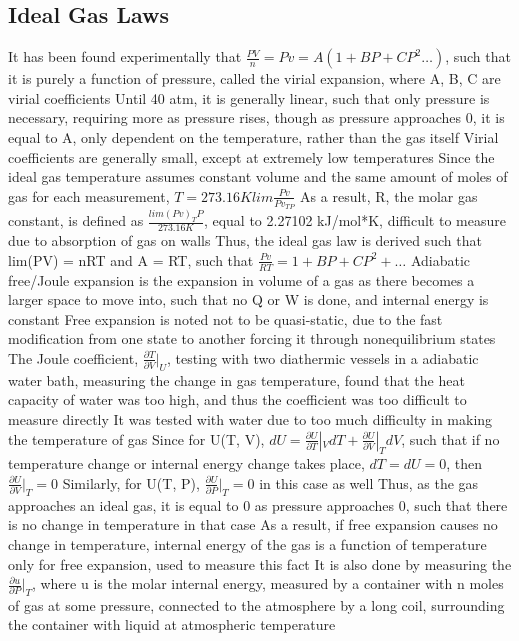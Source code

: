 \subsection{Ideal Gas Laws}
\begin{outline*}
\1 It has been found experimentally that $\frac{PV}{n} = Pv = A(1 + BP + CP^2 \dots)$, such that it is purely a function of pressure, called the virial expansion, where A, B, C are virial coefficients
\2 Until 40 atm, it is generally linear, such that only pressure is necessary, requiring more as pressure rises, though as pressure approaches 0, it is equal to A, only dependent on the temperature, rather than the gas itself 
\3 Virial coefficients are generally small, except at extremely low temperatures
\2 Since the ideal gas temperature assumes constant volume and the same amount of moles of gas for each measurement, $T = 273.16 K lim \frac{Pv}{Pv_{TP}}$
\3 As a result, R, the molar gas constant, is defined as $\frac{lim(Pv)_TP}{273.16 K}$, equal to 2.27102 kJ/mol*K, difficult to measure due to absorption of gas on walls
\3 Thus, the ideal gas law is derived such that lim(PV) = nRT and A = RT, such that $\frac{Pv}{RT} = 1 + BP + CP^2 + \dots$
\1 Adiabatic free/Joule expansion is the expansion in volume of a gas as there becomes a larger space to move into, such that no Q or W is done, and internal energy is constant
\2 Free expansion is noted not to be quasi-static, due to the fast modification from one state to another forcing it through nonequilibrium states
\2 The Joule coefficient, $\frac{\partial T}{\partial V}|_U$, testing with two diathermic vessels in a adiabatic water bath, measuring the change in gas temperature, found that the heat capacity of water was too high, and thus the coefficient was too difficult to measure directly
\3 It was tested with water due to too much difficulty in making the temperature of gas
\2 Since for U(T, V), $dU = \frac{\partial U}{\partial T}|_VdT + \frac{\partial U}{\partial V}|_TdV$, such that if no temperature change or internal energy change takes place, $dT = dU = 0$, then $\frac{\partial U}{\partial V}|_T = 0$
\3 Similarly, for U(T, P), $\frac{\partial U}{\partial P}|_T = 0$ in this case as well
\4 Thus, as the gas approaches an ideal gas, it is equal to 0 as pressure approaches 0, such that there is no change in temperature in that case
\3 As a result, if free expansion causes no change in temperature, internal energy of the gas is a function of temperature only for free expansion, used to measure this fact
\3 It is also done by measuring the $\frac{\partial u}{\partial P}|_T$, where u is the molar internal energy, measured by a container with n moles of gas at some pressure, connected to the atmosphere by a long coil, surrounding the container with liquid at atmospheric temperature

\end{outline*}
